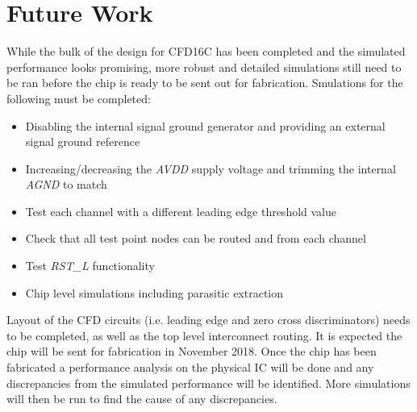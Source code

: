 \documentclass[12pt,oneside,final]{siuethesis}
\theoremstyle{definition}
\begin{document}
\section{Future Work}
\par While the bulk of the design for CFD16C has been completed and the simulated performance looks promising, more robust and detailed simulations still need to be ran before the chip is ready to be sent out for fabrication. Smulations for the following must be completed:
\begin{itemize}
\item Disabling the internal signal ground generator and providing an external signal ground reference
\item Increasing/decreasing the \emph{AVDD} supply voltage and trimming the internal \emph{AGND} to match
\item Test each channel with a different leading edge threshold value
\item Check that all test point nodes can be routed and from each channel
\item Test \emph{RST\_L} functionality
\item Chip level simulations including parasitic extraction
\end{itemize}
Layout of the CFD circuits (i.e. leading edge and zero cross discriminators) needs to be completed, as well as the top level interconnect routing. It is expected the chip will be sent for fabrication in November 2018. Once the chip has been fabricated a performance analysis on the physical IC will be done and any discrepancies from the simulated performance will be identified. More simulations will then be run to find the cause of any discrepancies. 

\nocite{*} %

{} %





\end{document}
